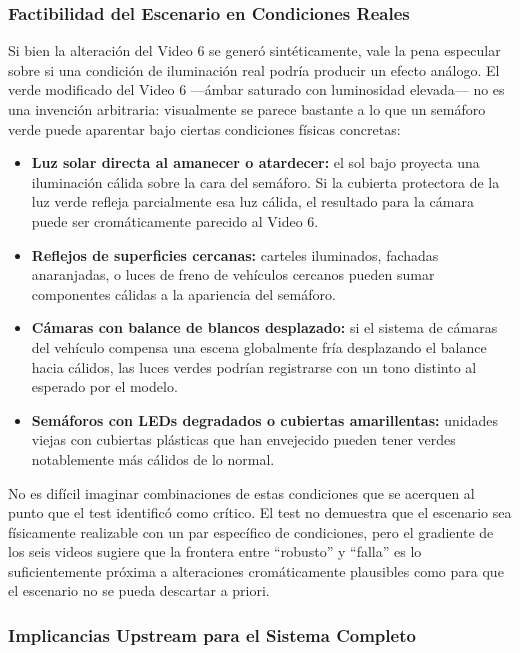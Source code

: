 \subsubsection{Factibilidad del Escenario en Condiciones Reales}

Si bien la alteración del Video 6 se generó sintéticamente, vale la pena especular sobre si una condición de iluminación real podría producir un efecto análogo. El verde modificado del Video 6 ---ámbar saturado con luminosidad elevada--- no es una invención arbitraria: visualmente se parece bastante a lo que un semáforo verde puede aparentar bajo ciertas condiciones físicas concretas:

\begin{itemize}
    \item \textbf{Luz solar directa al amanecer o atardecer:} el sol bajo proyecta una iluminación cálida sobre la cara del semáforo. Si la cubierta protectora de la luz verde refleja parcialmente esa luz cálida, el resultado para la cámara puede ser cromáticamente parecido al Video 6.
    \item \textbf{Reflejos de superficies cercanas:} carteles iluminados, fachadas anaranjadas, o luces de freno de vehículos cercanos pueden sumar componentes cálidas a la apariencia del semáforo.
    \item \textbf{Cámaras con balance de blancos desplazado:} si el sistema de cámaras del vehículo compensa una escena globalmente fría desplazando el balance hacia cálidos, las luces verdes podrían registrarse con un tono distinto al esperado por el modelo.
    \item \textbf{Semáforos con LEDs degradados o cubiertas amarillentas:} unidades viejas con cubiertas plásticas que han envejecido pueden tener verdes notablemente más cálidos de lo normal.
\end{itemize}

No es difícil imaginar combinaciones de estas condiciones que se acerquen al punto que el test identificó como crítico. El test no demuestra que el escenario sea físicamente realizable con un par específico de condiciones, pero el gradiente de los seis videos sugiere que la frontera entre ``robusto'' y ``falla'' es lo suficientemente próxima a alteraciones cromáticamente plausibles como para que el escenario no se pueda descartar a priori.

\subsubsection{Implicancias Upstream para el Sistema Completo}

